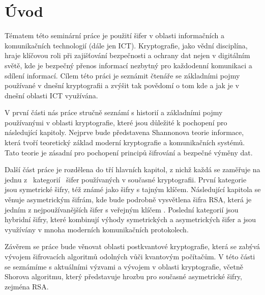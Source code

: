 \section {Úvod}
Tématem této seminární práce je použití šifer v oblasti informačních a komunikačních technologií (dále jen ICT). Kryptografie, jako vědní disciplína, hraje klíčovou roli při zajišťování bezpečnosti a ochrany dat nejen v digitálním světě, kde je bezpečný přenos informací nezbytný pro každodenní komunikaci a sdílení informací. Cílem této práci je seznámit čtenáře se základními pojmy používané v dnešní kryptografii a zvýšit tak povědomí o tom kde a jak je v dnešní oblasti ICT využívána.

V první části nás práce stručně seznámí s historií a základními pojmy používanými v oblasti kryptografie, které jsou důležité k pochopení pro následující kapitoly. Nejprve bude představena Shannonova teorie informace, která tvoří teoretický základ moderní kryptografie a komunikačních systémů. Tato teorie je zásadní pro pochopení principů šifrování a bezpečné výměny dat.

Další část práce je rozdělena do tří hlavních kapitol, z nichž každá se zaměřuje na jednu z ~kategorií~ šifer používaných v současné kryptografii. První kategorie jsou symetrické šifry, též známé jako šifry s tajným klíčem. Následující kapitola se věnuje asymetrickým šifrám, kde bude podrobně vysvětlena šifra RSA, která je jedním z nejpoužívanějších šifer s veřejným klíčem \parencite{drake2024}. Poslední kategorií jsou hybridní šifry, které kombinují výhody symetrických a asymetrických šifer a jsou využívány v mnoha moderních komunikačních protokolech.

Závěrem se práce bude věnovat oblasti postkvantové kryptografie, která se zabývá vývojem šifrovacích algoritmů odolných vůči kvantovým počítačům. V této části se seznámíme s aktuálními výzvami a vývojem v oblasti kryptografie, včetně \mbox{Shorova} algoritmu, který představuje hrozbu pro současné asymetrické šifry, zejména RSA.
\newpage
